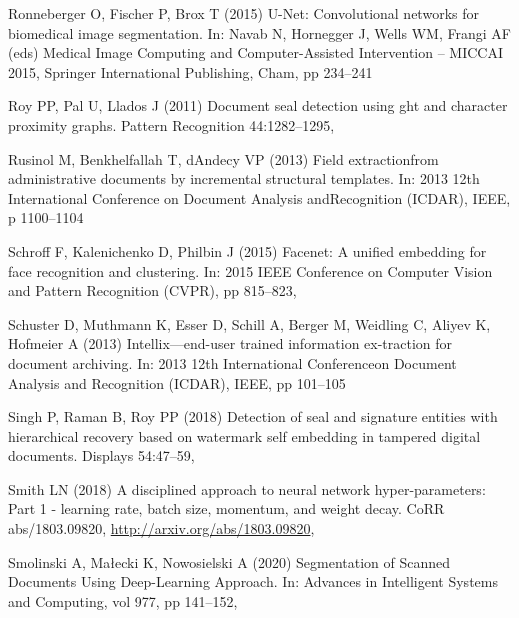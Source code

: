 \documentclass[twocolumn]{svjour3}
\begin{document}
\begin{thebibliography}{43}
	Ronneberger O, Fischer P, Brox T (2015) {U-Net}: {C}onvolutional networks for
	biomedical image segmentation. In: Navab N, Hornegger J, Wells WM, Frangi AF
	(eds) Medical Image Computing and Computer-Assisted Intervention -- MICCAI
	2015, Springer International Publishing, Cham, pp 234--241
	
	Roy PP, Pal U, Llados J (2011) Document seal detection using ght and character
	proximity graphs. Pattern Recognition 44:1282--1295,
	
	Rusinol M, Benkhelfallah T, {dAndecy} VP (2013) Field extractionfrom
	administrative documents by incremental structural templates. In: 2013 12th
	International Conference on Document Analysis andRecognition (ICDAR), IEEE, p
	1100–1104
	
	Schroff F, Kalenichenko D, Philbin J (2015) Facenet: A unified embedding for
	face recognition and clustering. In: 2015 IEEE Conference on Computer Vision
	and Pattern Recognition (CVPR), pp 815--823,
	
	Schuster D, Muthmann K, Esser D, Schill A, Berger M, Weidling C, Aliyev K,
	Hofmeier A (2013) Intellix---end-user trained information ex-traction for
	document archiving. In: 2013 12th International Conferenceon Document
	Analysis and Recognition (ICDAR), IEEE, pp 101--105
	
	Singh P, Raman B, Roy PP (2018) Detection of seal and signature entities with
	hierarchical recovery based on watermark self embedding in tampered digital
	documents. Displays 54:47--59,
	
	Smith LN (2018) A disciplined approach to neural network hyper-parameters: Part
	1 - learning rate, batch size, momentum, and weight decay. CoRR
	abs/1803.09820, \urlprefix\url{http://arxiv.org/abs/1803.09820},
	
	Smolinski A, Małecki K, Nowosielski A (2020) Segmentation of {Scanned}
	{Documents} {Using} {Deep}-{Learning} {Approach}. In: Advances in
	{Intelligent} {Systems} and {Computing}, vol 977, pp 141--152,
	

\end{thebibliography}
\end{document}
